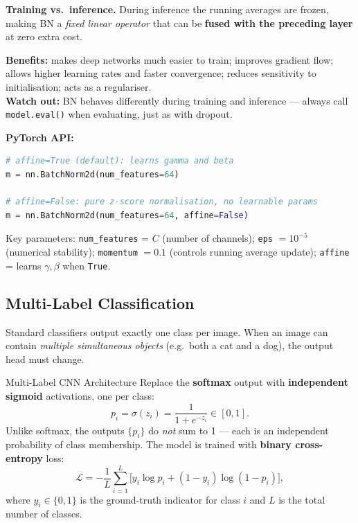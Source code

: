 \documentclass[11pt,a4paper]{article}
\begin{document}
\textbf{Training vs.\ inference.} During inference the running averages are frozen, making BN a \emph{fixed linear operator} that can be \textbf{fused with the preceding layer} at zero extra cost.

\begin{insightbox}
\textbf{Benefits:} makes deep networks much easier to train; improves gradient flow; allows higher learning rates and faster convergence; reduces sensitivity to initialisation; acts as a regulariser.\\
\textbf{Watch out:} BN behaves differently during training and inference — always call \texttt{model.eval()} when evaluating, just as with dropout.
\end{insightbox}

\textbf{PyTorch API:}
\begin{lstlisting}[language=Python, caption={BatchNorm2d in PyTorch}]
# affine=True (default): learns gamma and beta
m = nn.BatchNorm2d(num_features=64)

# affine=False: pure z-score normalisation, no learnable params
m = nn.BatchNorm2d(num_features=64, affine=False)
\end{lstlisting}
Key parameters: \texttt{num\_features} = $C$ (number of channels); \texttt{eps} $= 10^{-5}$ (numerical stability); \texttt{momentum} $= 0.1$ (controls running average update); \texttt{affine} = learns $\gamma, \beta$ when \texttt{True}.

\subsection{Multi-Label Classification}

Standard classifiers output exactly one class per image. When an image can contain \emph{multiple simultaneous objects} (e.g.\ both a cat and a dog), the output head must change.

\begin{defbox}{Multi-Label CNN Architecture}
Replace the \textbf{softmax} output with \textbf{independent sigmoid} activations, one per class:
\[
p_i = \sigma(z_i) = \frac{1}{1+e^{-z_i}} \in [0,1].
\]
Unlike softmax, the outputs $\{p_i\}$ do \emph{not} sum to 1 — each is an independent probability of class membership. The model is trained with \textbf{binary cross-entropy} loss:
\[
\mathcal{L} = -\frac{1}{L}\sum_{i=1}^{L}\bigl[y_i \log p_i + (1-y_i)\log(1-p_i)\bigr],
\]
where $y_i \in \{0,1\}$ is the ground-truth indicator for class $i$ and $L$ is the total number of classes.
\end{defbox}
\end{document}
